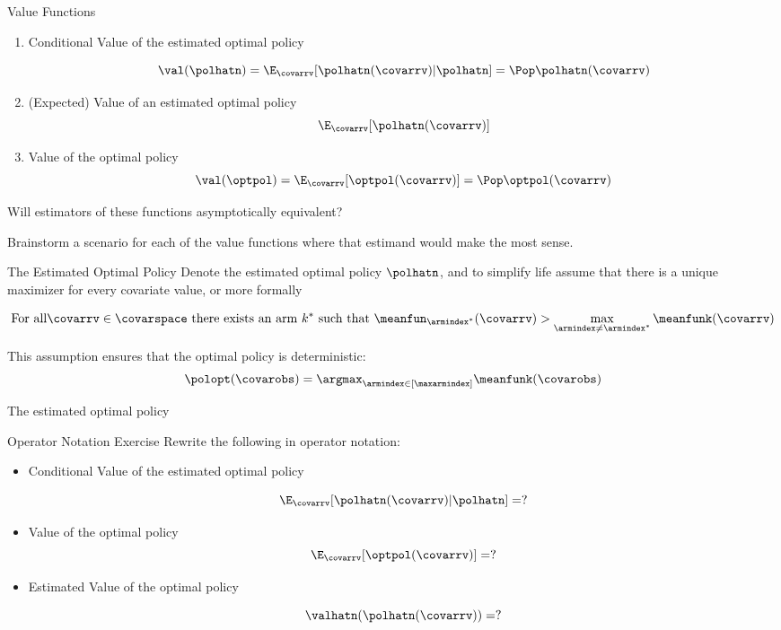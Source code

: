 \documentclass[aspectratio=169, professionalfonts]{beamer}
\begin{document}
\begin{frame}{Value Functions}
	\begin{enumerate}
		\item Conditional Value of the estimated optimal policy

		      $$\val(\polhatn) = \E_{\covarrv}[\polhatn(\covarrv) \vert \polhatn] = \Pop \polhatn(\covarrv)$$

		      \vfill \pause

		\item (Expected) Value of an estimated optimal policy
		      $$\E_{\covarrv}[\polhatn(\covarrv)]$$

		      \vfill \pause

		\item Value of the optimal policy
		      $$\val(\optpol) = \E_{\covarrv}[\optpol(\covarrv)] = \Pop \optpol(\covarrv)$$
	\end{enumerate}

	\vfill \pause

	Will estimators of these functions asymptotically equivalent?

	\vfill \pause
	Brainstorm a scenario for each of the value functions where that estimand
	would 	make the most sense.
\end{frame}


\begin{frame}{The Estimated Optimal Policy}
	Denote the estimated optimal policy $\polhatn$, and to simplify life assume
	that there is a unique maximizer for every covariate value, or more formally

	$$\text{For all} \covarrv \in \covarspace \text{ there exists an arm }k^*
		\text{ such that } \meanfun_{\armindex^*}(\covarrv) > \max_{\armindex \neq
			\armindex^*} \meanfunk(\covarrv)$$

	\vfill \pause
	This assumption ensures that the optimal policy is deterministic:
	$$\polopt(\covarobs) = \argmax_{\armindex \in [\maxarmindex]}\meanfunk(\covarobs)$$

	The estimated optimal policy
\end{frame}


\begin{frame}{Operator Notation Exercise}
	Rewrite the following in operator notation:
	\vfill
	\begin{itemize}

		\item Conditional Value of the estimated optimal policy

		      $$\E_{\covarrv}[\polhatn(\covarrv) \vert \polhatn] = ?$$

		\item Value of the optimal policy
		      $$\E_{\covarrv}[\optpol(\covarrv)] = ?$$

		\item Estimated Value of the optimal policy

		      $$\valhatn(\polhatn(\covarrv)) = ?$$
	\end{itemize}
	\vfill

\end{frame}
\end{document}
